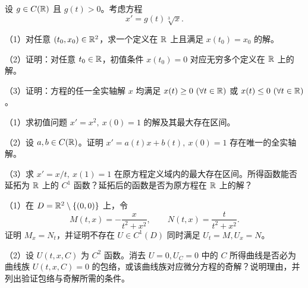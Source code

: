 \noindent\begin{minipage}{\linewidth}
设 $g\in C(\mathbb R)$ 且 $g(t)>0$。考虑方程
\[x'=g(t)\sqrt[3]{x}.\]
\par（1）对任意 $(t_0,x_0)\in\mathbb R^2$，求一个定义在 $\mathbb R$ 上且满足 $x(t_0)=x_0$ 的解。
\par（2）证明：对任意 $t_0\in\mathbb R$，初值条件 $x(t_0)=0$ 对应无穷多个定义在 $\mathbb R$ 上的解。
\par（3）证明：方程的任一全实轴解 $x$ 均满足 $x(t)\ge0\ (\forall t\in\mathbb R)$ 或 $x(t)\le0\ (\forall t\in\mathbb R)$。
\end{minipage}\par\vspace{5pt}
\noindent\begin{minipage}{\linewidth}
\par（1）求初值问题 $x'=x^2,\ x(0)=1$ 的解及其最大存在区间。
\par（2）设 $a,b\in C(\mathbb R)$。证明 $x'=a(t)x+b(t),\ x(0)=1$ 存在唯一的全实轴解。
\par（3）求 $x'=x/t,\ x(1)=1$ 在原方程定义域内的最大存在区间。所得函数能否延拓为 $\mathbb R$ 上的 $C^1$ 函数？延拓后的函数是否为原方程在 $\mathbb R$ 上的解？
\end{minipage}\par\vspace{5pt}
\noindent\begin{minipage}{\linewidth}
\par（1）在 $D=\mathbb R^2\setminus\{(0,0)\}$ 上，令
\[M(t,x)=-\frac{x}{t^2+x^2},\qquad N(t,x)=\frac{t}{t^2+x^2}.\]
证明 $M_x=N_t$，并证明不存在 $U\in C^1(D)$ 同时满足 $U_t=M,U_x=N$。
\par（2）设 $U(t,x,C)$ 为 $C^2$ 函数。消去 $U=0,U_C=0$ 中的 $C$ 所得曲线是否必为曲线族 $U(t,x,C)=0$ 的包络，或该曲线族对应微分方程的奇解？说明理由，并列出验证包络与奇解所需的条件。
\end{minipage}\par\vspace{5pt}
